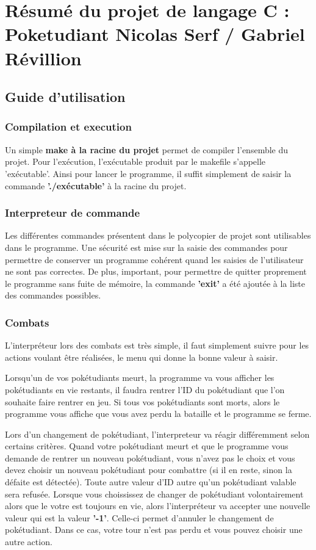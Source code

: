 \documentclass[10pt,a4paper,twocolumn]{report}
\begin{document}
\part{Résumé du projet de langage C : Poketudiant\newline
Nicolas Serf / Gabriel Révillion}

\chapter{Guide d'utilisation}
\section{Compilation et execution}
Un simple \textbf{make à la racine du projet} permet de compiler l'ensemble du projet.
Pour l'exécution, l'exécutable produit par le makefile s'appelle 'exécutable'.
Ainsi pour lancer le programme, il suffit simplement de saisir la commande \textbf{'./exécutable'} à la racine du projet.
\section{Interpreteur de commande}
Les différentes commandes présentent dans le polycopier de projet sont utilisables dans le programme.
Une sécurité est mise sur la saisie des commandes pour permettre de conserver un programme cohérent quand les saisies de l'utilisateur ne sont pas correctes.
De plus, important, pour permettre de quitter proprement le programme sans fuite de mémoire, la commande \textbf{'exit'} a été ajoutée à la liste des commandes possibles.
\section{Combats}
L'interpréteur lors des combats est très simple, il faut simplement suivre pour les actions voulant être réalisées, le menu qui donne la bonne valeur à saisir.

Lorsqu'un de vos pokétudiants meurt, la programme va vous afficher les pokétudiants en vie restants, il faudra rentrer l'ID du pokétudiant que l'on souhaite faire rentrer en jeu.
Si tous vos pokétudiants sont morts, alors le programme vous affiche que vous avez perdu la bataille et le programme se ferme.

Lors d'un changement de pokétudiant, l'interpreteur va réagir différemment selon certains critères.
Quand votre pokétudiant meurt et que le programme vous demande de rentrer un nouveau pokétudiant, vous n'avez pas le choix et vous devez choisir un nouveau pokétudiant pour combattre (si il en reste, sinon la défaite est détectée). Toute autre valeur d'ID autre qu'un pokétudiant valable sera refusée.
Lorsque vous choississez de changer de pokétudiant volontairement alors que le votre est toujours en vie, alors l'interpréteur va accepter une nouvelle valeur qui est la valeur \textbf{'-1'}. Celle-ci permet d'annuler le changement de pokétudiant. Dans ce cas, votre tour n'est pas perdu et vous pouvez choisir une autre action.
\end{document}
